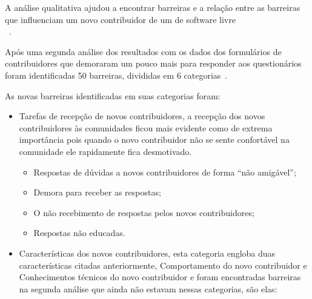 A análise qualitativa ajudou a encontrar barreiras e a relação entre as barreiras
que influenciam um novo contribuidor de um de software livre
\\~\cite{Steinmacher:2014:HLO:2593702.2593704}.

Após uma segunda análise dos resultados com os dados dos formulários de contribuidores 
que demoraram um pouco mais para responder aos questionários foram identificadas 
50 barreiras, divididas em 6 categorias~\cite{6943482}. 

As novas barreiras identificadas em suas categorias foram:

\begin{itemize}

\item Tarefas de recepção de novos contribuidores, a recepção dos novos contribuidores às 
comunidades ficou mais evidente como de extrema importância pois quando o novo 
contribuidor não se sente confortável na comunidade ele rapidamente fica desmotivado.
	\begin{itemize}
	\item Respostas de dúvidas a novos contribuidores de forma ``não amigável'';
	\item Demora para receber as respostas;
	\item O não recebimento de respostas pelos novos contribuidores;
	\item Respostas não educadas.
	\end{itemize}

\item Características dos novos contribuidores, esta categoria engloba duas características
citadas anteriormente, Comportamento do novo contribuidor e Conhecimentos técnicos do novo
contribuidor e foram encontradas barreiras na segunda análise que ainda não estavam nessas
categorias, são elas:


\end{itemize}
